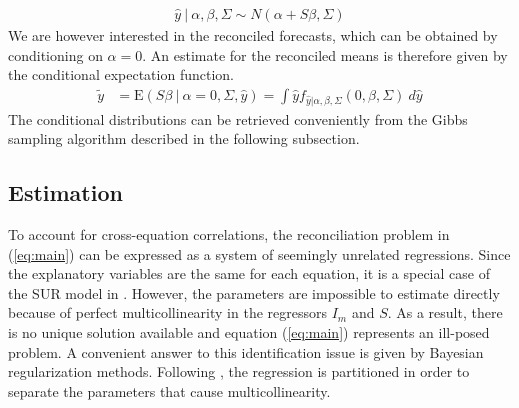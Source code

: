 \documentclass[a4paper,fleqn,11pt]{article}
\begin{document}
\begin{align}
\hat{y}\ |\ \alpha,\beta,\Sigma \sim N(\alpha + S\beta,\Sigma)
\end{align}
We are however interested in the reconciled forecasts, which can be obtained by conditioning on $\alpha = 0$. An estimate for the reconciled means is therefore given by the conditional expectation function.
\begin{align*}
\tilde{y} &= \text{E}(S\beta\ |\ \alpha = 0,\Sigma, \hat{y}) = \int \hat{y} f_{\hat{y}|\alpha,\beta,\Sigma}(0,\beta,\Sigma)\ d\hat{y}
\end{align*}
The conditional distributions can be retrieved conveniently from the Gibbs sampling algorithm described in the following subsection. 


\subsection{Estimation}
To account for cross-equation correlations, the reconciliation problem in (\ref{eq:main}) can be expressed as a system of seemingly unrelated regressions. Since the explanatory variables are the same for each equation, it is a special case of the SUR model in \cite{Zellner1962}. However, the parameters are impossible to estimate directly because of perfect multicollinearity in the regressors $I_m$ and $S$. As a result, there is no unique solution available and equation (\ref{eq:main}) represents an ill-posed problem. A convenient answer to this identification issue is given by Bayesian regularization methods. Following \cite{Farebrother1978}, the regression is partitioned in order to separate the parameters that cause multicollinearity.\\
\end{document}
